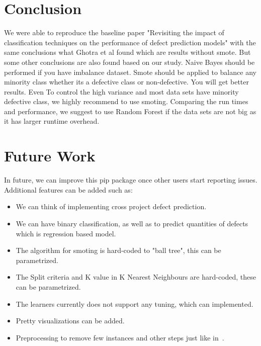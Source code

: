 \documentclass[conference]{IEEEtran}
\begin{document}
\section{Conclusion}
\label{conclusion}

We were able to reproduce the baseline paper "Revisiting the impact of classification techniques on the performance of defect prediction models" with the same conclusions what Ghotra et al found which are results without smote. But some other conclusions are also found based on our study. Naive Bayes should be performed if you have imbalance dataset. Smote should be applied to balance any minority class whether its a defective class or non-defective. You will get better results. Even To control the high variance and most data sets have minority defective class, we highly recommend to use smoting. Comparing the run times and performance, we suggest to use Random Forest if the data sets are not big as it has larger runtime overhead.

\section{Future Work}
\label{future}
In future, we can improve this pip package once other users start reporting issues. Additional features can be added such as:
\begin{itemize}
 \item We can think of implementing cross project defect prediction.
 \item We can have binary classification, as well as to predict quantities of defects which is regression based model.
 \item The algorithm for smoting is hard-coded to "ball tree", this can be parametrized.
 \item The Split criteria and K value in K Nearest Neighbours are hard-coded, these can be parametrized.
 \item The learners currently does not support any tuning, which can implemented.
 \item Pretty visualizations can be added.
 \item Preprocessing to remove few instances and other steps just like in~\cite{gray2009using}.
\end{itemize}

\balance


\medskip

\end{document}
